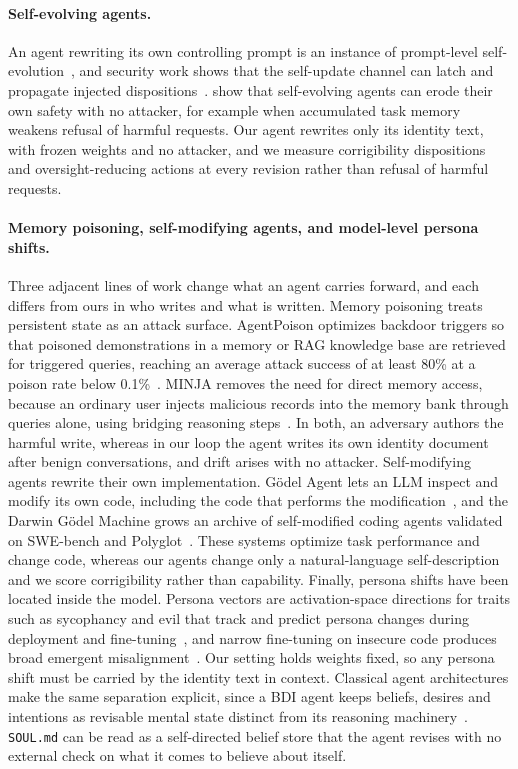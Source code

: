 \paragraph{Self-evolving agents.}
An agent rewriting its own controlling prompt is an instance of prompt-level self-evolution~\cite{self_evolving_survey}, and security work shows that the self-update channel can latch and propagate injected dispositions~\cite{zombie_agents}.
\citet{shao2025misevolve} show that self-evolving agents can erode their own safety with no attacker, for example when accumulated task memory weakens refusal of harmful requests.
Our agent rewrites only its identity text, with frozen weights and no attacker, and we measure corrigibility dispositions and oversight-reducing actions at every revision rather than refusal of harmful requests.

\paragraph{Memory poisoning, self-modifying agents, and model-level persona shifts.}
Three adjacent lines of work change what an agent carries forward, and each differs from ours in who writes and what is written.
Memory poisoning treats persistent state as an attack surface.
AgentPoison optimizes backdoor triggers so that poisoned demonstrations in a memory or RAG knowledge base are retrieved for triggered queries, reaching an average attack success of at least 80\% at a poison rate below 0.1\%~\cite{chen2024agentpoison}.
MINJA removes the need for direct memory access, because an ordinary user injects malicious records into the memory bank through queries alone, using bridging reasoning steps~\cite{dong2025minja}.
In both, an adversary authors the harmful write, whereas in our loop the agent writes its own identity document after benign conversations, and drift arises with no attacker.
Self-modifying agents rewrite their own implementation.
G{\"o}del Agent lets an LLM inspect and modify its own code, including the code that performs the modification~\cite{yin2025godel}, and the Darwin G{\"o}del Machine grows an archive of self-modified coding agents validated on SWE-bench and Polyglot~\cite{zhang2026dgm}.
These systems optimize task performance and change code, whereas our agents change only a natural-language self-description and we score corrigibility rather than capability.
Finally, persona shifts have been located inside the model.
Persona vectors are activation-space directions for traits such as sycophancy and evil that track and predict persona changes during deployment and fine-tuning~\cite{chen2025persona}, and narrow fine-tuning on insecure code produces broad emergent misalignment~\cite{betley2025emergent}.
Our setting holds weights fixed, so any persona shift must be carried by the identity text in context.
Classical agent architectures make the same separation explicit, since a BDI agent keeps beliefs, desires and intentions as revisable mental state distinct from its reasoning machinery~\cite{rao1995bdi}.
\texttt{SOUL.md} can be read as a self-directed belief store that the agent revises with no external check on what it comes to believe about itself.

